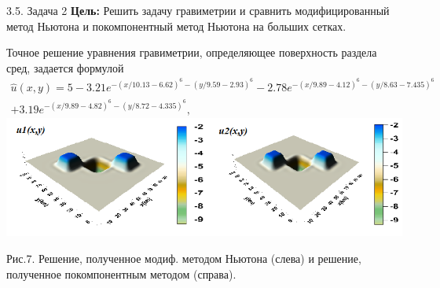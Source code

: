 \documentclass[10pt,pdf, mathserif, hyperref={unicode}]{beamer}
\begin{document}
\begin{frame}{\small 3.5. Задача 2}
	\textbf{\color{blue}Цель:} Решить задачу гравиметрии и сравнить модифицированный метод Ньютона и покомпонентный метод Ньютона на больших сетках.
	
	Точное решение уравнения гравиметрии, определяющее поверхность раздела сред, задается формулой
	\begin{equation*}
	\begin{aligned}
	\hat{u}(x,y)=5-3.21e^{-(x/10.13-6.62)^6-(y/9.59-2.93)^6}-2.78e^{-(x/9.89-4.12)^6-(y/8.63-7.435)^6}\\+3.19e^{-(x/9.89-4.82)^6-(y/8.72-4.335)^6},
	\end{aligned} 
	\end{equation*}
%	
\includegraphics[width=\textwidth, height=0.35\textheight]{gravy_kiev2015_methods.png}

\centering
Рис.7. Решение, полученное модиф. методом Ньютона (слева) и решение, полученное покомпонентным методом (справа).

\end{frame}
%	
%	
%	
%	
\end{document}

